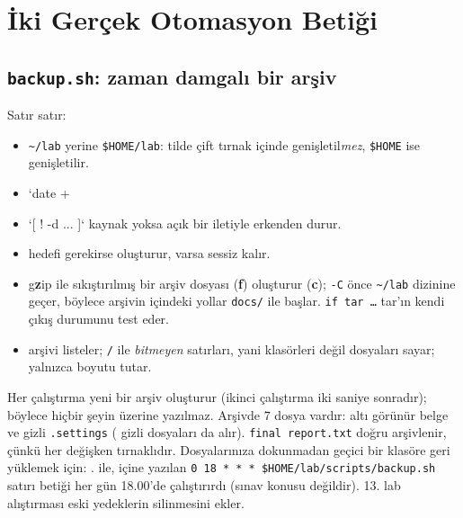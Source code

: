 \section{İki Gerçek Otomasyon Betiği}

\subsection{\texttt{backup.sh}: zaman damgalı bir arşiv}



Satır satır:
\begin{itemize}
  \item \texttt{\textasciitilde/lab} yerine \texttt{\$HOME/lab}: tilde çift tırnak içinde genişletil\emph{mez}, \texttt{\$HOME} ise genişletilir.
  \item `date +%
  \item `[ ! -d ... ]` kaynak yoksa açık bir iletiyle erkenden durur.
  \item {} hedefi gerekirse oluşturur, varsa sessiz kalır.
  \item {} g\textbf{z}ip ile sıkıştırılmış bir arşiv dosyası (\textbf{f}) oluşturur (\textbf{c}); \texttt{-C} önce \texttt{\textasciitilde/lab} dizinine geçer, böylece arşivin içindeki yollar \texttt{docs/} ile başlar. \texttt{if tar \ldots} tar'ın kendi çıkış durumunu test eder.
  \item {} arşivi listeler;  \texttt{/} ile \emph{bitmeyen} satırları, yani klasörleri değil dosyaları sayar;  yalnızca boyutu tutar.
\end{itemize}



Her çalıştırma yeni bir arşiv oluşturur (ikinci çalıştırma iki saniye sonradır); böylece hiçbir şeyin üzerine yazılmaz. Arşivde $7$ dosya vardır: altı görünür belge ve gizli \texttt{.settings} ( gizli dosyaları da alır). \texttt{final report.txt} doğru arşivlenir, çünkü her değişken tırnaklıdır. Dosyalarınıza dokunmadan geçici bir klasöre geri yüklemek için: .  ile,  içine yazılan \texttt{0 18 * * * \$HOME/lab/scripts/backup.sh} satırı betiği her gün 18.00'de çalıştırırdı (sınav konusu değildir). 13. lab alıştırması eski yedeklerin silinmesini ekler.

